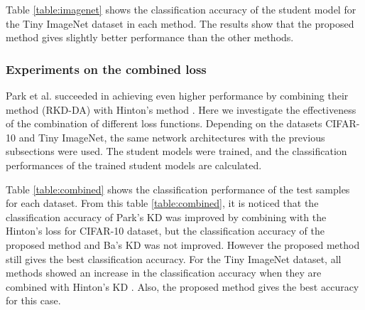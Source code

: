 \documentclass[twocolumn,10pt]{article}
\begin{document}
Table \ref{table:imagenet} shows the classification accuracy of the student model for the Tiny ImageNet dataset in each method.
The results show that the proposed method gives slightly better performance than the other methods.


\subsubsection{Experiments on the combined loss}

Park et al. \cite{Park2019} succeeded in achieving even higher performance by combining their method (RKD-DA) with Hinton's method \cite{Hinton2015}.
Here we investigate the effectiveness of the combination of different loss functions.
Depending on the datasets CIFAR-10 and Tiny ImageNet, the same network architectures with the previous subsections were used.
The student models were trained, and the classification performances of the trained student models are calculated.

\begin{table}[ht]
\caption{Classification accuracy for combined with HKD}
\label{table:combined}
\begin{center}
\end{center}
\end{table}

Table \ref{table:combined} shows the classification performance of the test samples for each dataset.
From this table \ref{table:combined}, it is noticed that the classification accuracy of Park's KD \cite{Park2019} was improved by combining with the Hinton's loss for CIFAR-10 dataset, but the classification accuracy of the proposed method and Ba's KD \cite{Ba2014} was not improved.
However the proposed method still gives the best classification accuracy.
For the Tiny ImageNet dataset, all methods showed an increase in the classification accuracy when they are combined with Hinton's KD \cite{Hinton2015}.
Also, the proposed method gives the best accuracy for this case.
\end{document}
